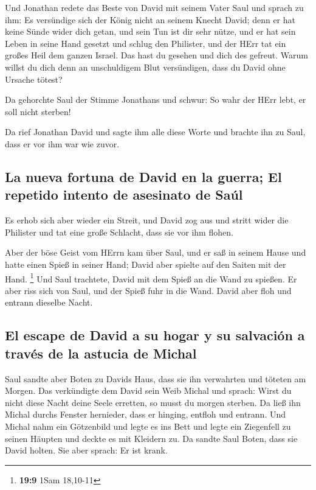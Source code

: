  Und Jonathan redete das Beste von David mit seinem Vater
Saul und sprach zu ihm: Es versündige sich der König nicht an seinem
Knecht David; denn er hat keine Sünde wider dich getan, und sein Tun ist
dir sehr nütze,  und er hat sein Leben in seine Hand
gesetzt und schlug den Philister, und der HErr tat ein großes Heil dem
ganzen Israel. Das hast du gesehen und dich des gefreut. Warum willst du
dich denn an unschuldigem Blut versündigen, dass du David ohne Ursache
tötest?

 Da gehorchte Saul der Stimme Jonathans und schwur: So
wahr der HErr lebt, er soll nicht sterben!

 Da rief Jonathan David und sagte ihm alle diese Worte und
brachte ihn zu Saul, dass er vor ihm war wie zuvor.

\hypertarget{la-nueva-fortuna-de-david-en-la-guerra-el-repetido-intento-de-asesinato-de-sauxfal}{%
\subsection{La nueva fortuna de David en la guerra; El repetido intento
de asesinato de
Saúl}\label{la-nueva-fortuna-de-david-en-la-guerra-el-repetido-intento-de-asesinato-de-sauxfal}}

 Es erhob sich aber wieder ein Streit, und David zog aus
und stritt wider die Philister und tat eine große Schlacht, dass sie vor
ihm flohen.

 Aber der böse Geist vom HErrn kam über Saul, und er saß
in seinem Hause und hatte einen Spieß in seiner Hand; David aber spielte
auf den Saiten mit der Hand. \footnote{\textbf{19:9} 1Sam 18,10-11}
 Und Saul trachtete, David mit dem Spieß an die Wand zu
spießen. Er aber riss sich von Saul, und der Spieß fuhr in die Wand.
David aber floh und entrann dieselbe Nacht.

\hypertarget{el-escape-de-david-a-su-hogar-y-su-salvaciuxf3n-a-travuxe9s-de-la-astucia-de-michal}{%
\subsection{El escape de David a su hogar y su salvación a través de la
astucia de
Michal}\label{el-escape-de-david-a-su-hogar-y-su-salvaciuxf3n-a-travuxe9s-de-la-astucia-de-michal}}

 Saul sandte aber Boten zu Davids Haus, dass sie ihn
verwahrten und töteten am Morgen. Das verkündigte dem David sein Weib
Michal und sprach: Wirst du nicht diese Nacht deine Seele erretten, so
musst du morgen sterben.  Da ließ ihn Michal durchs
Fenster hernieder, dass er hinging, entfloh und entrann. 
Und Michal nahm ein Götzenbild und legte es ins Bett und legte ein
Ziegenfell zu seinen Häupten und deckte es mit Kleidern zu.
 Da sandte Saul Boten, dass sie David holten. Sie aber
sprach: Er ist krank.

